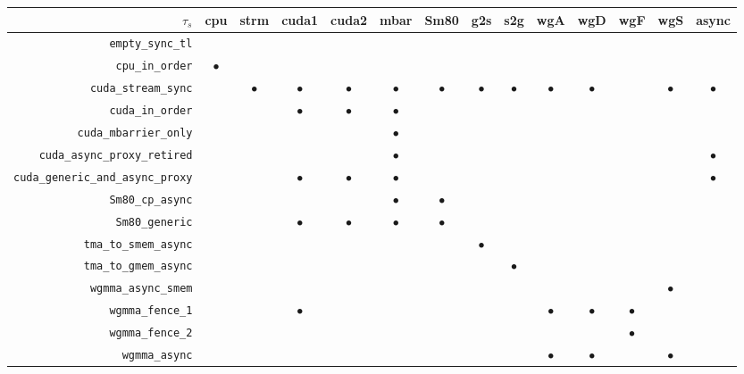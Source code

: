 \begin{tabular}{|r|cc|ccc|ccc|cccc|c|}
\hline
$\tau_s$ & cpu & strm & cuda1 & cuda2 & mbar & Sm80 & g2s & s2g & wgA & wgD & wgF & wgS & async \\
\hline
\texttt{empty\_sync\_tl} &  &  &  &  &  &  &  &  &  &  &  &  & \\
\hline
\texttt{cpu\_in\_order} & $\bullet$ &  &  &  &  &  &  &  &  &  &  &  & \\
\hline
\texttt{cuda\_stream\_sync} &  & $\bullet$ & $\bullet$ & $\bullet$ & $\bullet$ & $\bullet$ & $\bullet$ & $\bullet$ & $\bullet$ & $\bullet$ &  & $\bullet$ & $\bullet$\\
\texttt{cuda\_in\_order} &  &  & $\bullet$ & $\bullet$ & $\bullet$ &  &  &  &  &  &  &  & \\
\texttt{cuda\_mbarrier\_only} &  &  &  &  & $\bullet$ &  &  &  &  &  &  &  & \\
\texttt{cuda\_async\_proxy\_retired} &  &  &  &  & $\bullet$ &  &  &  &  &  &  &  & $\bullet$\\
\texttt{cuda\_generic\_and\_async\_proxy} &  &  & $\bullet$ & $\bullet$ & $\bullet$ &  &  &  &  &  &  &  & $\bullet$\\
\hline
\texttt{Sm80\_cp\_async} &  &  &  &  & $\bullet$ & $\bullet$ &  &  &  &  &  &  & \\
\texttt{Sm80\_generic} &  &  & $\bullet$ & $\bullet$ & $\bullet$ & $\bullet$ &  &  &  &  &  &  & \\
\hline
\texttt{tma\_to\_smem\_async} &  &  &  &  &  &  & $\bullet$ &  &  &  &  &  & \\
\texttt{tma\_to\_gmem\_async} &  &  &  &  &  &  &  & $\bullet$ &  &  &  &  & \\
\hline
\texttt{wgmma\_async\_smem} &  &  &  &  &  &  &  &  &  &  &  & $\bullet$ & \\
\texttt{wgmma\_fence\_1} &  &  & $\bullet$ &  &  &  &  &  & $\bullet$ & $\bullet$ & $\bullet$ &  & \\
\texttt{wgmma\_fence\_2} &  &  &  &  &  &  &  &  &  &  & $\bullet$ &  & \\
\texttt{wgmma\_async} &  &  &  &  &  &  &  &  & $\bullet$ & $\bullet$ &  & $\bullet$ & \\
\hline
\end{tabular}
